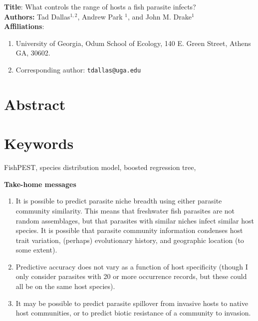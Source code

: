 \documentclass[12pt]{article}
\begin{document}
\setcounter{page}{1}

\textbf{Title}: What controls the range of hosts a fish parasite infects? \\
\vspace{0.35cm}
\textbf{Authors:} Tad Dallas$^{1,2}$, Andrew Park $^{1}$, and John M. Drake$^{1}$ \\
\vspace{0.35cm}
\textbf{Affiliations}: 
\begin{enumerate}
  \item University of Georgia, Odum School of Ecology, 140 E. Green Street, Athens GA, 30602. 
  \item Corresponding author: \texttt{tdallas@uga.edu}
\end{enumerate}


\linenumbers
\doublespacing


\section*{Abstract}









\section*{Keywords}
FishPEST, species distribution model, boosted regression tree, 




\textbf{Take-home messages} \\
\begin{enumerate}
 \item It is possible to predict parasite niche breadth using either parasite community similarity. This means that freshwater fish parasites are not random assemblages, but that parasites with similar niches infect similar host species. It is possible that parasite community information condenses host trait variation, (perhaps) evolutionary history, and geographic location (to some extent).   

 \item Predictive accuracy does not vary as a function of host specificity (though I only consider parasites with 20 or more occurrence records, but these could all be on the same host species).
 
 \item It may be possible to predict parasite spillover from invasive hosts to native host communities, or to predict biotic resistance of a community to invasion. 
\end{enumerate}
\end{document}
